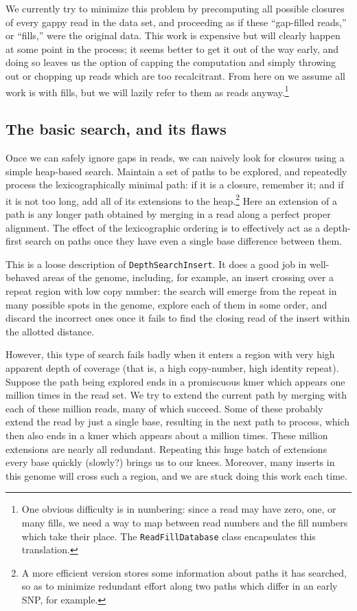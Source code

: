\documentclass[11pt]{article}
\begin{document}
We currently try to minimize this problem by precomputing all possible closures of
every gappy read in the data set, and proceeding as if these ``gap-filled reads,''
or ``fills,'' were the original data.  This work is expensive but will clearly happen
at some point in the process; it seems better to get it out of the way early, and
doing so leaves us the option of capping the computation and simply throwing out
or chopping up reads which are too recalcitrant.  From here on we assume all work
is with fills, but we will lazily refer to them as reads anyway.\footnote{One obvious
difficulty is in numbering: since a read may have zero, one, or many 
fills, we need a way to map between read numbers and the fill numbers which take 
their place.  The {\tt ReadFillDatabase} class encapsulates this translation.}

\subsection*{The basic search, and its flaws}

Once we can safely ignore gaps in reads, we can naively look for closures using
a simple heap-based search.  Maintain a set of paths to be explored, and repeatedly
process the lexicographically minimal path: if it is a closure, remember it; and if it is
not too long, add all of its extensions to the heap.\footnote{\label{fn_reconverge}A more 
efficient version stores some information about paths it has searched, so as to minimize 
redundant effort along two paths which differ in an early SNP, for example.}  
Here an extension of a path is any longer path obtained by merging in a read along a 
perfect proper alignment.  The effect of the lexicographic ordering is to effectively act as a 
depth-first search on paths once they have even a single base difference between them.

This is a loose description of {\tt DepthSearchInsert}.  It does a good job in well-behaved 
areas of the genome, including, for example, an insert crossing over a repeat region
with low copy number: the search will emerge from the repeat in many possible spots
in the genome, explore each of them in some order, and discard the incorrect ones once
it fails to find the closing read of the insert within the allotted distance.

However, this type of search fails badly when it enters a region with very high
apparent depth of coverage (that is, a high copy-number, high identity repeat).  
Suppose the path being explored ends in a promiscuous kmer which appears 
one million times in the read set.  We try to extend the current path by merging 
with each of these million reads, many of which succeed.  Some of these probably
extend the read by just a single base, resulting in the next path to process,
which then also ends in a kmer which appears about a million times.  These million
extensions are nearly all redundant.  Repeating this huge batch of extensions
every base quickly (slowly?) brings us to our knees.  Moreover, many inserts in this
genome will cross such a region, and we are stuck doing this work each time.
\end{document}
